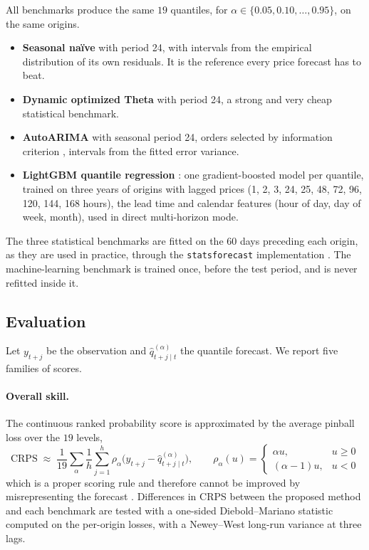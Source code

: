 \documentclass[12pt,a4paper]{article}
\begin{document}
All benchmarks produce the same $19$ quantiles, for
$\alpha\in\{0.05,0.10,\dots,0.95\}$, on the same origins.

\begin{itemize}
\item \textbf{Seasonal na\"ive} with period 24, with intervals from the
empirical distribution of its own residuals. It is the reference every price
forecast has to beat.
\item \textbf{Dynamic optimized Theta} with period 24, a strong and very cheap
statistical benchmark.
\item \textbf{AutoARIMA} with seasonal period 24, orders selected by
information criterion \citep{Hyndman2008}, intervals from the fitted error
variance.
\item \textbf{LightGBM quantile regression} \citep{Ke2017,Koenker1978}: one
gradient-boosted model per quantile, trained on three years of origins with
lagged prices (1, 2, 3, 24, 25, 48, 72, 96, 120, 144, 168 hours), the lead
time and calendar features (hour of day, day of week, month), used in direct
multi-horizon mode.
\end{itemize}

The three statistical benchmarks are fitted on the 60 days preceding each
origin, as they are used in practice, through the \texttt{statsforecast}
implementation \citep{Garza2022}. The machine-learning benchmark is trained
once, before the test period, and is never refitted inside it.

\subsection{Evaluation}
\label{sec:eval}

Let $y_{t+j}$ be the observation and $\hat q^{(\alpha)}_{t+j\mid t}$ the
quantile forecast. We report five families of scores.

\paragraph{Overall skill.} The continuous ranked probability score is
approximated by the average pinball loss over the $19$ levels,
\begin{equation}
\mathrm{CRPS} \;\approx\; \frac{1}{19}\sum_{\alpha}
\frac{1}{h}\sum_{j=1}^{h} \rho_\alpha\!\big(y_{t+j}-\hat
q^{(\alpha)}_{t+j\mid t}\big),
\qquad
\rho_\alpha(u)=\begin{cases}\alpha u, & u\ge 0\\ (\alpha-1)u, & u<0
\end{cases}
\end{equation}
which is a proper scoring rule and therefore cannot be improved by
misrepresenting the forecast \citep{Gneiting2007}. Differences in CRPS between
the proposed method and each benchmark are tested with a one-sided
Diebold--Mariano statistic computed on the per-origin losses, with a
Newey--West long-run variance at three lags.
\end{document}
